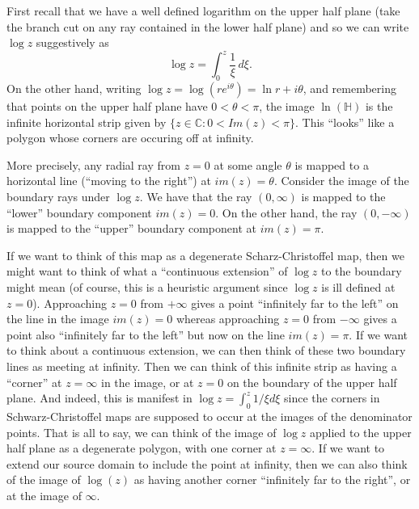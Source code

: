 \documentclass[12pt,letterpaper,boxed]{hmcpset}
\newcommand{\C}{\mathbb C}
\renewcommand{\H}{\mathbb H}
\begin{document}
\begin{solution}
First recall that we have a well defined logarithm on the upper half
plane (take the branch cut on any ray contained in the lower half
plane) and so we can write $\log z$ suggestively as 
\[
	\log z = \int_0^z \frac{1}{\xi} \, d\xi.
\]
On the other hand, writing $\log z = \log(r e^{i\theta}) = \ln r +
i\theta$, and remembering that points on the upper half plane have $0 <
\theta < \pi$, the image $\ln(\H)$ is the infinite horizontal strip
given by $\{z \in \C: 0 < Im(z) < \pi \}$. This ``looks'' like a
polygon whose corners are occuring off at infinity.

More precisely, any radial ray from $z=0$ at some angle $\theta$ is
mapped to a horizontal line (``moving to the right'') at $im(z) =
\theta$. Consider the image of the boundary rays under $\log z$. We
have that the ray $(0, \infty)$ is mapped to the ``lower''
boundary component $im(z) = 0$. On the other hand, the ray
$(0,-\infty)$ is mapped to the ``upper'' boundary component at $im(z) =
\pi$. 

If we want to think of this map as a degenerate
Scharz-Christoffel map, then we might want to think of what a
``continuous extension'' of $\log z$ to the boundary might mean (of
course, this is a heuristic argument since $\log z$ is ill defined at
$z= 0$).
Approaching $z=
0$ from $+\infty$ gives a point ``infinitely far to the left'' on the
line in the image $im(z) = 0$ whereas approaching $z=0$ from $-\infty$ gives a
point also ``infinitely far to the left'' but now on the line $im(z) =
\pi$. If we want to think about a continuous extension, we can then
think of these two boundary lines as meeting at infinity. Then we can
think of this infinite strip as having a ``corner'' at $z = \infty$ in
the image, or at $z = 0$ on the boundary of the upper half plane. And
indeed, this is manifest in $\log z = \int_0^z 1/\xi d\xi$ since the
corners in Schwarz-Christoffel maps are supposed to occur at the images
of the denominator points. 
That is all to say, we can think of the image of $\log z$ applied to
the upper half plane as a degenerate polygon, with one corner at $z =
\infty$. 
If we want to extend our source domain to include the point at
infinity, then we can also think of the image of $\log(z)$ as having
another corner ``infinitely far to the right'', or at the image of
$\infty$.

\end{solution}

\newpage
\end{document}
